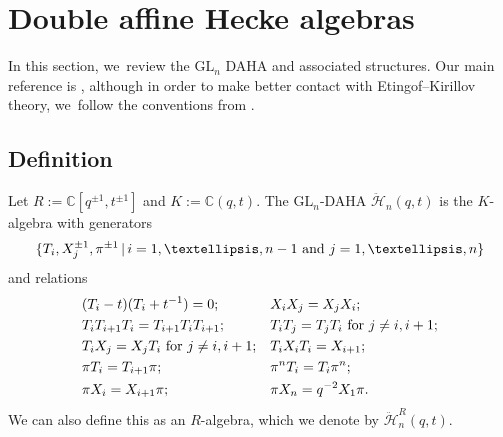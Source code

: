 \documentclass[11pt]{article}
\newcommand{\GL}{\mathrm{GL}}
\theoremstyle{definition}
\newcommand{\CC}{\mathbb{C}}
\newcommand{\HH}{\ddot{\mathcal{H}}}
\begin{document}
\section{Double affine Hecke algebras}

In this section, we~review the $\GL_n$ DAHA and associated structures.
Our main reference is \cite{ChereDAHA}, although in order to make better contact with Etingof--Kirillov theory, we~follow the conventions from \cite{KirLec}.

\subsection{Definition}
Let $R:=\CC[q^{\pm1},t^{\pm1}]$ and $K:=\CC(q,t)$.
The $\GL_n$-DAHA $\HH_n(q,t)$ is the $K$-algebra with generators
\[
\{T_i,
X_j^{\pm 1},
\pi^{\pm 1}\, |\,i=1,\ldots, n-1\hbox{ and } j=1,\ldots, n\}
\]
and relations
\begin{equation*}
\begin{aligned}
&(T_i-t)(T_i+t^{-1})=0;&&X_iX_j=X_jX_i; \\
&T_iT_{i+1}T_i=T_{i+1}T_iT_{i+1};&& T_iT_j=T_jT_i\hbox{ for }j\not=i, i+1;\\
&T_iX_j=X_jT_i\hbox{ for }j\not=i, i+1; && T_iX_iT_i=X_{i+1}; \\
&\pi T_i=T_{i+1}\pi; && \pi^n T_i=T_i\pi^n;\\
&\pi X_i=X_{i+1}\pi;&& \pi X_n=q^{-2}X_1\pi.
\end{aligned}
\end{equation*}
We can also define this as an $R$-algebra, which we denote by $\HH^R_n(q,t)$.
\end{document}
